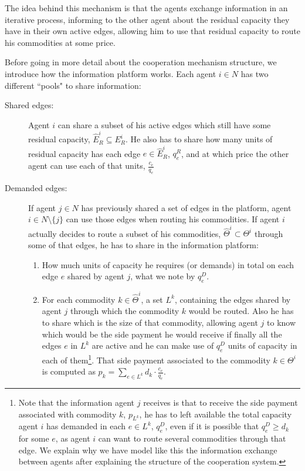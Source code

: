\documentclass{article}
\begin{document}
The idea behind this mechanism is that the agents exchange information in an iterative process, informing to the other agent about the residual capacity they have in their own active edges, allowing him to use that residual capacity to route his commodities at some price.

Before going in more detail about the cooperation mechanism structure, we introduce how the information platform works. Each agent $i\in N$ has two different ``pools" to share information:

\begin{description}
	\item[Shared edges:] Agent $i$ can share a subset of his active edges which still have some residual capacity, $\widehat{E}_R^i\subseteq E_R^i$. He also has to share how many units of residual capacity has each edge $e\in \widehat{E}_R^i$, $q_e^R$, and at which price the other agent can use each of that units, $\frac{c_e}{q_e}$
	\item[Demanded edges:] If agent $j\in N$ has previously shared a set of edges in the platform, agent $i\in N\setminus\{j\}$ can use those edges when routing his commodities. If agent $i$ actually decides to route a subset of his commodities, $\widehat{\Theta}^i\subset \Theta ^i$ through some of that edges, he has to share in the information platform:
	\begin{enumerate}
		\item How much units of capacity he requires (or demands) in total on each edge $e$ shared by agent $j$, what we note by $q_e^D$.
	\item For each commodity $k\in \widehat{\Theta}^i$, a set $L^k$, containing the edges shared by agent $j$ through which the commodity $k$ would be routed. Also he has to share which is the size of that commodity, allowing agent $j$ to know which would be the side payment he would receive if finally all the edges $e$ in $L^k$ are active and he can make use of $q_e^D$ units of capacity in each of them\footnote{\label{ft:sidepaymentexplanation}
Note that the information agent $j$ receives is that to receive the side payment associated with commodity $k$, $p_{L^k}$, he has to left available the total capacity agent $i$ has demanded in each $e\in L^k$, $q_e^D$, even if it is possible that $q_e^D\geq d_k$ for some $e$, as agent $i$ can want to route several commodities through that edge. We explain why we have model like this the information exchange between agents after explaining the structure of the cooperation system.}.
That side payment associated to the commodity $k\in \Theta^i$ is computed as $p_k=\sum_{e \in L^k} d_k\cdot \frac{c_e}{q_e}$. 
	\end{enumerate}
		
\end{description}	
\end{document}
